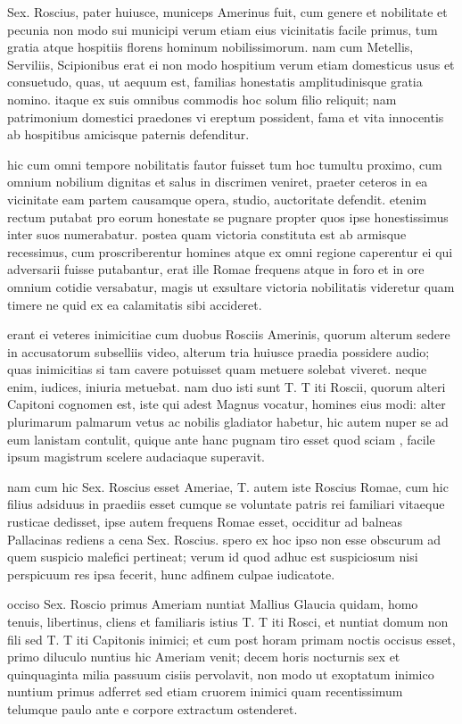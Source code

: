  Sex. Roscius, pater huiusce, municeps Amerinus fuit, cum genere et nobilitate et pecunia non modo sui municipi verum etiam eius vicinitatis facile primus, tum gratia atque hospitiis florens hominum nobilissimorum. nam cum Metellis, Serviliis, Scipionibus erat ei non modo hospitium verum etiam domesticus usus et consuetudo, quas, ut aequum est, familias honestatis amplitudinisque gratia nomino. itaque ex suis omnibus commodis hoc solum filio reliquit; nam patrimonium domestici praedones vi ereptum possident, fama et vita innocentis ab hospitibus amicisque paternis defenditur.

 hic cum omni tempore nobilitatis fautor fuisset tum hoc tumultu proximo, cum omnium nobilium dignitas et salus in discrimen veniret, praeter ceteros in ea vicinitate eam partem causamque opera, studio, auctoritate defendit. etenim rectum putabat pro eorum honestate se pugnare propter quos ipse honestissimus inter suos numerabatur. postea quam victoria constituta est ab armisque recessimus, cum proscriberentur homines atque ex omni regione caperentur ei qui adversarii fuisse putabantur, erat ille Romae frequens atque in foro et in ore omnium cotidie versabatur, magis ut exsultare victoria nobilitatis videretur quam timere ne quid ex ea calamitatis sibi accideret.

 erant ei veteres inimicitiae cum duobus Rosciis Amerinis, quorum alterum sedere in accusatorum subselliis video, alterum tria huiusce praedia possidere audio; quas inimicitias si tam cavere potuisset quam metuere solebat viveret. neque enim, iudices, iniuria metuebat. nam duo isti sunt T. T iti Roscii, quorum alteri Capitoni cognomen est, iste qui adest Magnus vocatur, homines eius modi: alter plurimarum palmarum vetus ac nobilis gladiator habetur, hic autem nuper se ad eum lanistam contulit, quique ante hanc pugnam tiro esset quod sciam , facile ipsum magistrum scelere audaciaque superavit.

 nam cum hic Sex. Roscius esset Ameriae, T. autem iste Roscius Romae, cum hic filius adsiduus in praediis esset cumque se voluntate patris rei familiari vitaeque rusticae dedisset, ipse autem frequens Romae esset, occiditur ad balneas Pallacinas rediens a cena Sex. Roscius. spero ex hoc ipso non esse obscurum ad quem suspicio malefici pertineat; verum id quod adhuc est suspiciosum nisi perspicuum res ipsa fecerit, hunc adfinem culpae iudicatote.

 occiso Sex. Roscio primus Ameriam nuntiat Mallius Glaucia quidam, homo tenuis, libertinus, cliens et familiaris istius T. T iti Rosci, et nuntiat domum non fili sed T. T iti Capitonis inimici; et cum post horam primam noctis occisus esset, primo diluculo nuntius hic Ameriam venit; decem horis nocturnis sex et quinquaginta milia passuum cisiis pervolavit, non modo ut exoptatum inimico nuntium primus adferret sed etiam cruorem inimici quam recentissimum telumque paulo ante e corpore extractum ostenderet.

